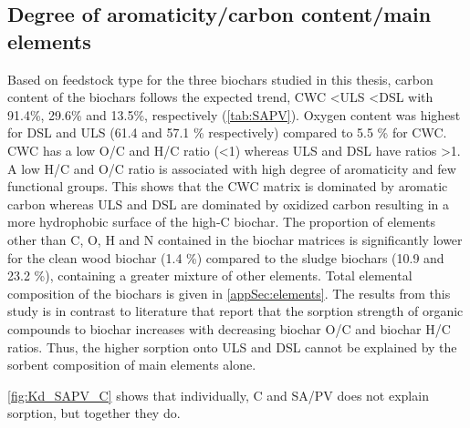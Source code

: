 \subsection{Degree of aromaticity/carbon content/main elements}
Based on feedstock type for the three biochars studied in this thesis, carbon content of the biochars follows the expected trend, CWC \textless ULS \textless DSL with 91.4\%, 29.6\% and 13.5\%, respectively (\cref{tab:SAPV}). Oxygen content was highest for DSL and ULS (61.4 and 57.1 \% respectively) compared to 5.5 \% for CWC. CWC has a low O/C and H/C ratio (\textless 1) whereas ULS and DSL have ratios \textgreater 1. A low H/C and O/C ratio is associated with high degree of aromaticity and few functional groups. This shows that the CWC matrix is dominated by aromatic carbon whereas ULS and DSL are dominated by oxidized carbon resulting in a more hydrophobic surface of the high-C biochar. The proportion of elements other than C, O, H and N contained in the biochar matrices is significantly lower for the clean wood biochar (1.4 \%) compared to the sludge biochars (10.9 and 23.2 \%), containing a greater mixture of other elements. Total elemental composition of the biochars is given in \cref{appSec:elements}. The results from this study is in contrast to literature \citep{Hale2016,Sormo2021,zhang2021sorption} that report that the sorption strength of organic compounds to biochar increases with decreasing biochar O/C and biochar H/C ratios. Thus, the higher sorption onto ULS and DSL cannot be explained by the sorbent composition of main elements alone.

\cref{fig:Kd_SAPV_C} shows that individually, C and SA/PV does not explain sorption, but together they do.


